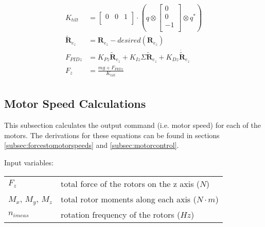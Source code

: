 \documentclass{article}
\numberwithin{equation}{section} %
\newcommand{\bs}[1]{\boldsymbol{#1}}
\begin{document}
\begin{align}
K_{tilt} &= 
	\begin{bmatrix}
		0 & 0 & 1 \\	
	\end{bmatrix}
	\cdot
	\left(
		q \otimes
			\begin{bmatrix}
				0 \\
				0 \\
				-1 \\
			\end{bmatrix}
		\otimes q^*
	\right) \\
\tilde{\bs{R}}_{e_z} &= \bs{R}_{e_z} - desired \left( \bs{R}_{e_z} \right) \\
	F_{PIDz} &= K_{Pz} \tilde{\bs{R}}_{e_z} + K_{Iz} \Sigma \tilde{\bs{R}}_{e_z} + K_{Dz} \dot{\tilde{\bs{R}}}_{e_z} \\ %
	F_z &= \frac{mg + F_{PIDz}} {K_{tilt}} \\
	\end{align}







\subsection{Motor Speed Calculations} \label{subsec:motorspeedcalculations}
This subsection calculates the output command (i.e. motor speed) for each of the motors. The derivations for these equations can be found in sections \ref{subsec:forcestomotorspeeds} and \ref{subsec:motorcontrol}.

\bigskip
Input variables:
\begin{tabular}{l l}
 	$ F_{z} $				& total force of the rotors on the z axis ($N$) \\
 	$ M_{x}$, $M_y$, $M_{z} $		& total rotor moments along each axis ($N \cdot m$) \\
 	$ n_{imeas} $					& rotation frequency of the rotors ($Hz$) \\

\end{tabular}
\end{document}
